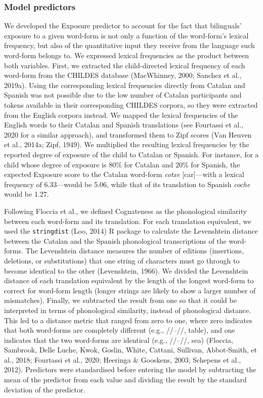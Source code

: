 \documentclass[
  12pt,
  b5paperpaper,
  twoside]{scrreprt}
\begin{document}
\hypertarget{sec-predictors}{%
\subsubsection{Model predictors}\label{sec-predictors}}

We developed the Exposure predictor to account for the fact that
bilinguals' exposure to a given word-form is not only a function of the
word-form's lexical frequency, but also of the quantitative input they
receive from the language such word-form belongs to. We expressed
lexical frequencies as the product between both variables. First, we
extracted the child-directed lexical frequency of each word-form from
the CHILDES database (MacWhinney, 2000; Sanchez et al., 2019a). Using
the corresponding lexical frequencies directly from Catalan and Spanish
was not possible due to the low number of Catalan participants and
tokens available in their corresponding CHILDES corpora, so they were
extracted from the English corpora instead. We mapped the lexical
frequencies of the English words to their Catalan and Spanish
translations (see Fourtassi et al., 2020 for a similar approach), and
transformed them to Zipf scores (Van Heuven et al., 2014a; Zipf, 1949).
We multiplied the resulting lexical frequencies by the reported degree
of exposure of the child to Catalan or Spanish. For instance, for a
child whose degree of exposure is 80\% for Catalan and 20\% for Spanish,
the expected Exposure score to the Catalan word-form \emph{cotxe}
{[}car{]}---with a lexical frequency of 6.33---would be 5.06, while that
of its translation to Spanish \emph{coche} would be 1.27.

Following Floccia et al., we defined Cognateness as the phonological
similarity between each word-form and its translation. For each
translation equivalent, we used the \texttt{stringdist} (Loo, 2014) R
package to calculate the Levenshtein distance between the Catalan and
the Spanish phonological transcriptions of the word-forms. The
Levenshtein distance measures the number of editions (insertions,
deletions, or substitutions) that one string of characters must go
through to become identical to the other (Levenshtein, 1966). We divided
the Levenshtein distance of each translation equivalent by the length of
the longest word-form to correct for word-form length (longer strings
are likely to show a larger number of mismatches). Finally, we
subtracted the result from one so that it could be interpreted in terms
of phonological similarity, instead of phonological distance. This led
to a distance metric that ranged from zero to one, where zero indicates
that both word-forms are completely different (e.g.,
//--//, table), and one indicates that
the two word-forms are identical (e.g.,
//--//, sea) (Floccia, Sambrook, Delle
Luche, Kwok, Goslin, White, Cattani, Sullivan, Abbot‐Smith, et al.,
2018; Fourtassi et al., 2020; Heeringa \& Gooskens, 2003; Schepens et
al., 2012). Predictors were standardised before entering the model by
subtracting the mean of the predictor from each value and dividing the
result by the standard deviation of the predictor.
\end{document}
